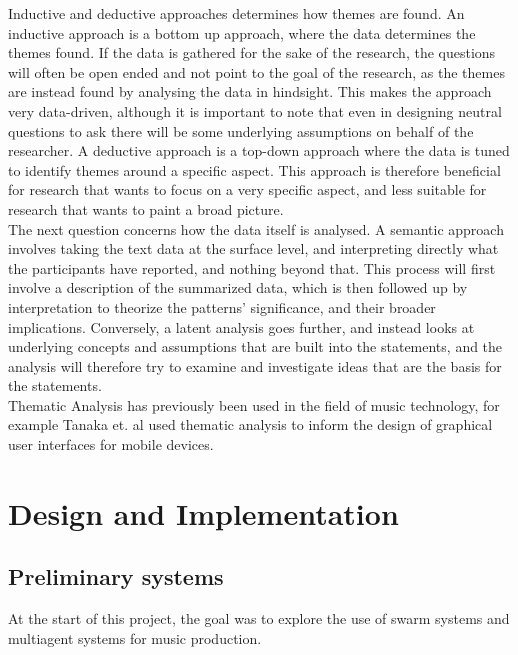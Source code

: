 \documentclass[a4paper,english]{report}
\begin{document}
	Inductive and deductive approaches determines how themes are found. An inductive approach is a bottom up approach, where the data determines the themes found. If the data is gathered for the sake of the research, the questions will often be open ended and not point to the goal of the research, as the themes are instead found by analysing the data in hindsight. This makes the approach very data-driven, although it is important to note that even in designing neutral questions to ask there will be some underlying assumptions on behalf of the researcher. A deductive approach is a top-down approach where the data is tuned to identify themes around a specific aspect. This approach is therefore beneficial for research that wants to focus on a very specific aspect, and less suitable for research that wants to paint a broad picture.\\
	The next question concerns how the data itself is analysed. A semantic approach involves taking the text data at the surface level, and interpreting directly what the participants have reported, and nothing beyond that. This process will first involve a description of the summarized data, which is then followed up by interpretation to theorize the patterns' significance, and their broader implications. Conversely, a latent analysis goes further, and instead looks at underlying concepts and assumptions that are built into the statements, and the analysis will therefore try to examine and investigate ideas that are the basis for the statements.\\
	Thematic Analysis has previously been used in the field of music technology, for example Tanaka et. al used thematic analysis to inform the design of graphical user interfaces for mobile devices. \cite{tanaka2012survey}
	
	\chapter{Design and Implementation}
	\section{Preliminary systems}
	At the start of this project, the goal was to explore the use of swarm systems and multiagent systems for music production.
	
\end{document}
